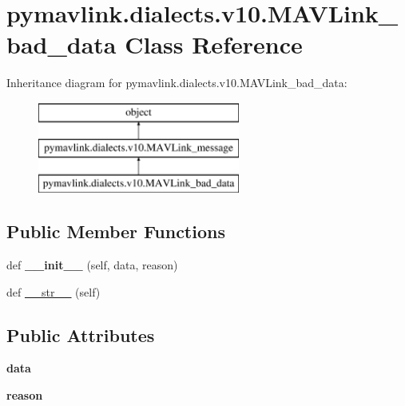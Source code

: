 \hypertarget{classpymavlink_1_1dialects_1_1v10_1_1MAVLink__bad__data}{}\section{pymavlink.\+dialects.\+v10.\+M\+A\+V\+Link\+\_\+bad\+\_\+data Class Reference}
\label{classpymavlink_1_1dialects_1_1v10_1_1MAVLink__bad__data}
Inheritance diagram for pymavlink.\+dialects.\+v10.\+M\+A\+V\+Link\+\_\+bad\+\_\+data\+:\begin{figure}[H]
\begin{center}
\leavevmode
\includegraphics[height=3.000000cm]{classpymavlink_1_1dialects_1_1v10_1_1MAVLink__bad__data}
\end{center}
\end{figure}
\subsection*{Public Member Functions}
\begin{DoxyCompactItemize}
\item 
\mbox{\label{classpymavlink_1_1dialects_1_1v10_1_1MAVLink__bad__data_ac78b9551fe177fee873cc55218710b89}} 
def {\bfseries \+\_\+\+\_\+init\+\_\+\+\_\+} (self, data, reason)
\item 
def \hyperlink{classpymavlink_1_1dialects_1_1v10_1_1MAVLink__bad__data_adb767168c11d9ddb770cb100674fbed4}{\+\_\+\+\_\+str\+\_\+\+\_\+} (self)
\end{DoxyCompactItemize}
\subsection*{Public Attributes}
\begin{DoxyCompactItemize}
\item 
\mbox{\label{classpymavlink_1_1dialects_1_1v10_1_1MAVLink__bad__data_a93912de829fe8ac572f9f10a16d831c9}} 
{\bfseries data}
\item 
\mbox{\label{classpymavlink_1_1dialects_1_1v10_1_1MAVLink__bad__data_ae85c766a0ea802d5dfa16632cbe4025c}} 
{\bfseries reason}
\end{DoxyCompactItemize}


